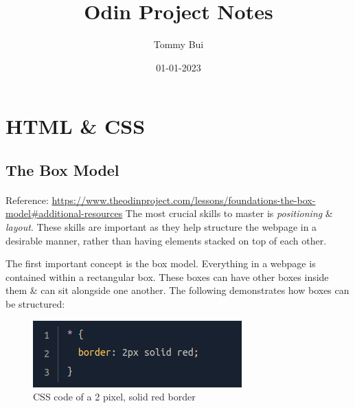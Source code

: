 \documentclass{article}
\title{Odin Project Notes}
\date{01-01-2023}
\author{Tommy Bui}
\begin{document}
	\maketitle
	\newpage

	\tableofcontents
	\newpage

	\section{HTML \& CSS}

	\subsection{The Box Model}
	\paragraph{} 
	Reference: \url{https://www.theodinproject.com/lessons/foundations-the-box-model#additional-resources} \newline \newline
	The most crucial skills to master is {\em positioning} \& {\em layout}. These skills are important as they help structure 
	the webpage in a desirable manner, rather than having elements stacked on top of each other. \newline

	The first important concept is the box model. Everything in a webpage is contained within a rectangular box. These boxes
	can have other boxes inside them \& can sit alongside one another. The following demonstrates how boxes can be structured:

	\begin{figure}[h!]
		\includegraphics[width=\linewidth]{OdinProjectPics/borders.png}
		\caption{CSS code of a 2 pixel, solid red border}
		\label{border}
	\end{figure}
\end{document}
